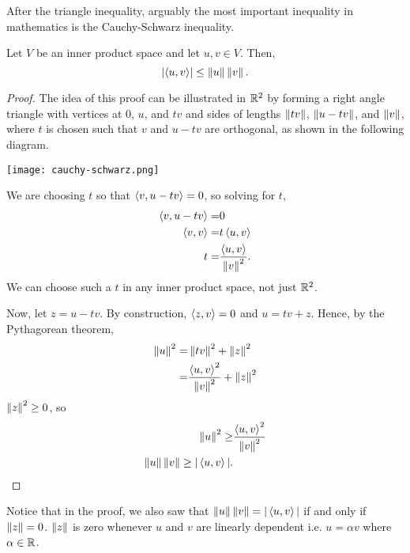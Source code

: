 After the triangle inequality, arguably the most important inequality
in mathematics is the Cauchy-Schwarz inequality. 
\begin{theorem}
  Let $V$ be an inner product space and let $u,v\in V$. Then,
  \[ \left\vert \left\langle {u} , {v} \right\rangle \right\vert \leq \left\Vert {u} \right\Vert\left\Vert {v} \right\Vert. \]
\end{theorem}
\begin{proof}
  The idea of this proof can be illustrated in $\mathbb{R}^2$ by forming a right
  angle triangle with vertices at $0$, $u$, and $tv$ and sides of
  lengths $\left\Vert {tv} \right\Vert$, $\left\Vert {u-tv} \right\Vert$, and $\left\Vert {v} \right\Vert$, where $t$ is
  chosen such that $v$ and $u-tv$ are orthogonal, as shown in the
  following diagram.
  \begin{center}
    \texttt{[image: cauchy-schwarz.png]}
  \end{center}
  We are choosing $t$ so that $\left\langle {v} , {u-tv} \right\rangle = 0$, so solving for $t$,
  \begin{align*}
    \left\langle {v} , {u-tv} \right\rangle = & 0 \\
    \left\langle {v} , {v} \right\rangle = & t \left\langle {u} , {v} \right\rangle \\
    t = & \frac{\left\langle {u} , {v} \right\rangle}{\left\Vert {v} \right\Vert^2}.
  \end{align*}
  We can choose such a $t$ in any inner product space, not just
  $\mathbb{R}^2$.
  
  Now, let $z = u-tv$. By construction, $\left\langle {z} , {v} \right\rangle = 0$ and $u = tv
  + z$. Hence, by the Pythagorean theorem,
  \begin{align*}
    \left\Vert {u} \right\Vert^2 = & \left\Vert {tv} \right\Vert^2 + \left\Vert {z} \right\Vert^2 \\
    = & \frac{\left\langle {u} , {v} \right\rangle^2}{\left\Vert {v} \right\Vert^2} + \left\Vert {z} \right\Vert^2 
  \end{align*}
  $\left\Vert {z} \right\Vert^2\geq 0$, so
  \begin{align*}
    \left\Vert {u} \right\Vert^2 \geq & \frac{\left\langle {u} , {v} \right\rangle^2}{\left\Vert {v} \right\Vert^2} \\
    \left\Vert {u} \right\Vert\left\Vert {v} \right\Vert \geq |\left\langle {u} , {v} \right\rangle|.
  \end{align*}
\end{proof}
Notice that in the proof, we also saw that  $\left\Vert {u} \right\Vert\left\Vert {v} \right\Vert =
|\left\langle {u} , {v} \right\rangle|$ if and only if $\left\Vert {z} \right\Vert = 0$. $\left\Vert {z} \right\Vert$ is zero
whenever $u$ and $v$ are linearly dependent i.e. $u = \alpha v$ where
$\alpha \in \mathbb{R}$. 

